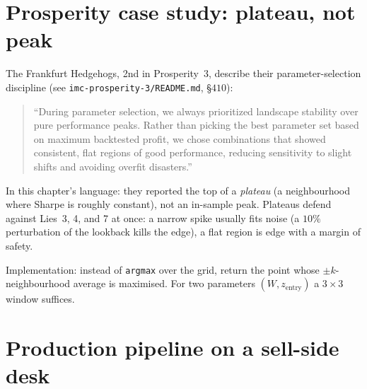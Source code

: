 \section{Prosperity case study: plateau, not peak}
\label{sec:bt_prosperity}

\begin{prosperitybox}
The Frankfurt Hedgehogs, 2nd in Prosperity~3, describe their
parameter-selection discipline (see
\texttt{imc-prosperity-3/README.md}, \S$410$):

\begin{quote}
``During parameter selection, we always prioritized landscape
stability over pure performance peaks. Rather than picking the
best parameter set based on maximum backtested profit, we
chose combinations that showed consistent, flat regions of
good performance, reducing sensitivity to slight shifts and
avoiding overfit disasters.''
\end{quote}

In this chapter's language: they reported the top of a \emph{plateau}
(a neighbourhood where Sharpe is roughly constant), not an in-sample
peak. Plateaus defend against Lies~3, 4, and 7 at once: a narrow
spike usually fits noise (a $10\%$ perturbation of the lookback kills
the edge), a flat region is edge with a margin of safety.

Implementation: instead of \texttt{argmax} over the grid, return the
point whose $\pm k$-neighbourhood average is maximised. For two
parameters $(W, z_{\text{entry}})$ a $3 \times 3$ window suffices.
\end{prosperitybox}

\section{Production pipeline on a sell-side desk}
\label{sec:bt_gs}


